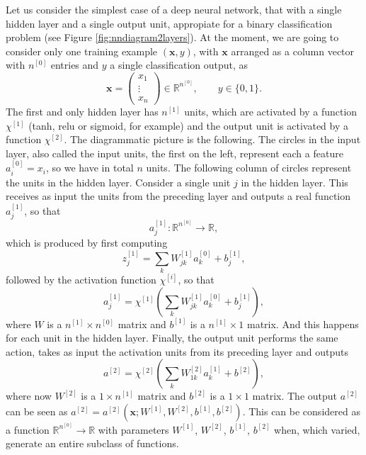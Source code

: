 \documentclass[aps,10pt]{revtex4}
\theoremstyle{plain}
\theoremstyle{definition}
\theoremstyle{remark}
\begin{document}
\noindent Let us consider the simplest case of a deep neural network, that with a single hidden layer and a single output unit, appropiate for a binary classification problem (see Figure \ref{fig:nndiagram2layers}). At the moment, we are going to consider only one training example $(\mathbf{x},y)$, with $\mathbf{x}$ arranged as a column vector with $n^{[0]}$ entries and $y$ a single classification output, as
\begin{equation}
 \mathbf{x} = 
 \begin{pmatrix}
 x_1 \\
 \vdots \\
 x_n
 \end{pmatrix}\in\mathbb{R}^{n^{[0]}}, \qquad y\in\{0,1\}.
\end{equation}
The first and only hidden layer has $n^{[1]}$ units, which are activated by a function $\chi^{[1]}$ (tanh, relu or sigmoid, for example) and the output unit is activated by a function $\chi^{[2]}$. The diagrammatic picture is the following. The circles in the input layer, also called the input units, the first on the left, represent each a feature $a^{[0]}_i = x_i$, so we have in total $n$ units. The following column of circles represent the units in the hidden layer. Consider a single unit $j$ in the hidden layer. This receives as input the units from the preceding layer and outputs a real function $a^{[1]}_j$, so that
\begin{equation}
a^{[1]}_j : \mathbb{R}^{n^{[0]}}\rightarrow\mathbb{R},
\end{equation}
which is produced by first computing
\begin{equation}
 z_j^{[1]} = \sum_k W_{jk}^{[1]}a^{[0]}_k + b_j^{[1]},
\end{equation}
followed by the activation function $\chi^{[i]}$, so that
\begin{equation}
a_j^{[1]} = \chi^{[1]}\left(\sum_k W_{jk}^{[1]}a^{[0]}_k + b_j^{[1]}\right),
\end{equation}
where $W$ is a $n^{[1]}\times n^{[0]}$ matrix and $b^{[1]}$ is a $n^{[1]}\times 1$ matrix. And this happens for each unit in the hidden layer. Finally, the output unit performs the same action, takes as input the activation units from its preceding layer and outputs
\begin{equation}
 a^{[2]} = \chi^{[2]}\left(\sum_k W_{1k}^{[2]}a^{[1]}_k + b^{[2]}\right),
\end{equation}
where now $W^{[2]}$ is a $1\times n^{[1]}$ matrix and $b^{[2]}$ is a $1\times 1$ matrix. The output $a^{[2]}$ can be seen as $a^{[2]} = a^{[2]}\left(\mathbf{x};W^{[1]},W^{[2]},b^{[1]},b^{[2]}\right)$. This can be considered as a function $\mathbb{R}^{n^{[0]}}\rightarrow\mathbb{R}$ with parameters $W^{[1]}$, $W^{[2]}$, $b^{[1]}$, $b^{[2]}$ when, which varied, generate an entire subclass of functions.
\end{document}
